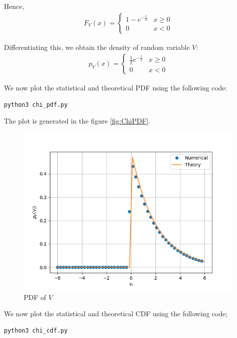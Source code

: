\documentclass[journal,12pt,twocolumn]{IEEEtran}
\renewcommand\thesection{\arabic{section}}
\begin{document}
\begin{enumerate}[label=\thesection.\arabic*
,ref=\thesection.\theenumi]
	Hence,
	\begin{align}
		F_V(x) =
		\begin{cases}
			1 - e^{-\frac{x}{2}} & x \geq 0 \\
			0 & x < 0
		\end{cases}
		\label{eq:V_CDF}
	\end{align}

	Differentiating this, we obtain the density of random variable $V$:
	\begin{align}
		p_V(x) = 
		\begin{cases}
			\frac{1}{2} e^{-\frac{x}{2}} & x \geq 0 \\
			0 & x < 0
		\end{cases}
		\label{eq:V_PDF}
	\end{align}

	We now plot the statistical and theoretical PDF using the following code:
	\begin{lstlisting}
python3 chi_pdf.py
	\end{lstlisting}
	
	The plot is generated in the figure \eqref{fig:ChiPDF}.
	\begin{figure}
	\centering
	\includegraphics[width=\columnwidth]{../figs/chi_pdf.png}
	\caption{PDF of $V$}
	\label{fig:ChiPDF}
	\end{figure}


	We now plot the statistical and theoretical CDF using the following code;
	\begin{lstlisting}
python3 chi_cdf.py
	\end{lstlisting}


\end{enumerate}
\end{document}
